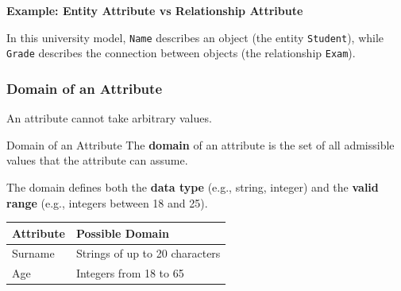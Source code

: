 \vspace{0.2cm}
\begin{example}{\textbf{Example: Entity Attribute vs Relationship Attribute}}

    In this university model, \texttt{Name} describes an object (the entity \texttt{Student}), while \texttt{Grade} describes the connection between objects (the relationship \texttt{Exam}).

\vspace{0.2cm}
\begin{center}
\end{center}

\end{example}

\subsubsection{Domain of an Attribute}
An attribute cannot take arbitrary values.

\begin{defbox}{Domain of an Attribute}
The \textbf{domain} of an attribute is the set of all admissible values that the attribute can assume.
\end{defbox}

The domain defines both the \textbf{data type} (e.g., string, integer) and the \textbf{valid range} (e.g., integers between 18 and 25).

\vs
\begin{center}
\begin{tabular}{|l|l|}
\hline
\textbf{Attribute} & \textbf{Possible Domain} \\
\hline
Surname & Strings of up to 20 characters \\
Age & Integers from 18 to 65 \\
\hline
\end{tabular}
\end{center}

